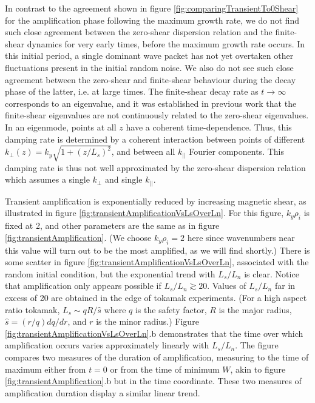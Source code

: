 \documentclass{jpp}
\begin{document}
In contrast to the agreement shown in figure
\ref{fig:comparingTransientTo0Shear} for the amplification phase
following the maximum growth rate, we do not find such close agreement
between the zero-shear dispersion relation and the finite-shear
dynamics for very early times, before the maximum growth rate occurs.
In this initial period, a single dominant wave packet has not yet
overtaken other fluctuations present in the initial random noise.  We
also do not see such close agreement between the zero-shear and
finite-shear behaviour during the decay phase of the latter, i.e. at
large times.  The finite-shear decay rate as $t \to \infty$
corresponds to an eigenvalue, and it was established in previous work
\citep{Ross,Tsang,Antonsen} that the finite-shear eigenvalues
are not continuously related to the zero-shear eigenvalues.  In an
eigenmode, points at all $z$ have a coherent time-dependence.  Thus,
this damping rate is determined by a coherent interaction between
points of different $k_\perp(z)=k_y\sqrt{1+(z/L_s)^2}$, and between
all $k_{||}$ Fourier components.  This damping rate is thus not well
approximated by the zero-shear dispersion relation which assumes a
single $k_\perp$ and single $k_{||}$.

Transient amplification is exponentially reduced by increasing magnetic shear,
as illustrated in figure \ref{fig:transientAmplificationVsLsOverLn}.
For this figure, $k_y \rho_i$ is fixed at 2, and other parameters
are the same as in figure \ref{fig:transientAmplification}.
(We choose $k_y \rho_i=2$ here since
wavenumbers near this value will turn out to be the most
amplified, as we will find shortly.)
There is some scatter in figure \ref{fig:transientAmplificationVsLsOverLn}, associated with the random initial condition,
but the exponential trend with $L_s/L_n$ is clear.
Notice that amplification only appears possible if $L_s/L_n \gtrsim 20$.
Values of $L_s/L_n$ far in excess of 20 are obtained in the edge of tokamak experiments.
(For a high aspect ratio tokamak, $L_s \sim qR/\hat{s}$ where $q$ is the safety factor, $R$ is
the major radius, $\hat{s} = (r/q) dq/dr$, and $r$ is the minor radius.)
Figure \ref{fig:transientAmplificationVsLsOverLn}.b demonstrates that the time over which amplification occurs
varies approximately linearly with $L_s/L_n$.
The figure compares two measures of the duration of amplification, measuring to the time of maximum either from $t=0$
or from the time of minimum $W$, akin to figure \ref{fig:transientAmplification}.b but in the time coordinate.
These two measures of amplification duration display a similar linear trend.
\end{document}
